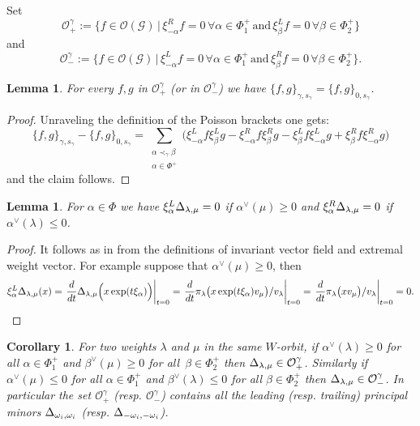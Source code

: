 \documentclass[a4paper]{amsart}
\newtheorem{corollary}[theorem]{Corollary}
\newtheorem{lemma}[theorem]{Lemma}
\theoremstyle{definition}
\newcommand{\mcO}{\mathcal{O}}
\newcommand{\mcG}{\mathcal{G}}
\begin{document}
Set 
\[
  \mcO^\gamma_+:=\Big\{f\in\mcO(\mcG)\,\Big|\, \xi_{-\alpha}^Rf=0 \,\forall \alpha\in\Phi^+_1\,\text{and}\, \xi_\beta^Lf=0 \,\forall\beta\in\Phi^+_2\Big\}
\]
and
\[
  \mcO^\gamma_-:=\Big\{f\in\mcO(\mcG)\,\Big|\, \xi_{-\alpha}^Lf=0 \,\forall \alpha\in\Phi^+_1\,\text{and}\, \xi_\beta^Rf=0 \,\forall\beta\in\Phi^+_2\Big\}.
\]

\begin{lemma}
  For every $f,g$ in $\mcO^\gamma_+$ (or in $\mcO^\gamma_-$) we have $\{f,g\}_{\gamma,s_\gamma} =\{f,g\}_{0,s_\gamma}$.
\end{lemma}

\begin{proof}
  Unraveling the definition of the Poisson brackets one gets:
  \[
    \{f,g\}_{\gamma,s_\gamma} - \{f,g\}_{0,s_\gamma}
    = 
    \sum_{\substack{\alpha\prec_\gamma\beta\\ \alpha\in\Phi^+}} \Big(\xi_{-\alpha}^L f \xi_\beta^L g - \xi_{-\alpha}^R f \xi_\beta^R g - \xi_\beta^L f \xi_{-\alpha}^L g + \xi_\beta^R f \xi_{-\alpha}^R g\Big)
  \]
  and the claim follows.
\end{proof}

\begin{lemma}
  \label{lem: derivatives of minors}
  For $\alpha\in\Phi$ we have $\xi_\alpha^L \minor[\lambda][\mu] = 0$ if $\alpha^\vee(\mu)\geq0$ and $\xi_\alpha^R \minor[\lambda][\mu] = 0$ if $\alpha^\vee(\lambda)\leq0$.
\end{lemma}
\begin{proof}
  It follows as in \cite[Lemma 2.6]{RSW17} from the definitions of invariant vector field and extremal weight vector.
  For example suppose that $\alpha^\vee(\mu) \geq 0$, then
  \[
    \xi_\alpha^L\minor[\lambda][\mu](x)
    =
    \left.\frac{d}{dt}\minor[\lambda][\mu]\Big(x \exp(t\xi_\alpha)\Big)\right|_{t=0}
    =
    \left.\frac{d}{dt}\pi_\lambda\big(x \exp(t\xi_\alpha)v_\mu\big)/v_\lambda\right|_{t=0}
    =
    \left.\frac{d}{dt}\pi_\lambda\big(x v_\mu\big)/v_\lambda\right|_{t=0}
    =
    0.
  \]
\end{proof}

\begin{corollary}
  \label{cor: tuned}
  For two weights $\lambda$ and $\mu$ in the same $W$-orbit, if $\alpha^\vee(\lambda)\geq0$ for all $\alpha\in\Phi^+_1$ and $\beta^\vee(\mu)\geq0$ for all~$\beta\in\Phi^+_2$ then $\minor[\lambda][\mu]\in\mcO^\gamma_+$.
  Similarly if $\alpha^\vee(\mu)\leq0$ for all $\alpha\in\Phi^+_1$ and $\beta^\vee(\lambda)\leq0$ for all $\beta\in\Phi^+_2$ then $\minor[\lambda][\mu]\in\mcO^\gamma_-$.
  In particular the set $\mcO^\gamma_+$ (resp. $\mcO^\gamma_-$) contains all the leading (resp. trailing) principal minors $\minor[\omega_i][\omega_i]$ (resp. $\minor[-\omega_i][-\omega_i]$).
\end{corollary}
\end{document}

